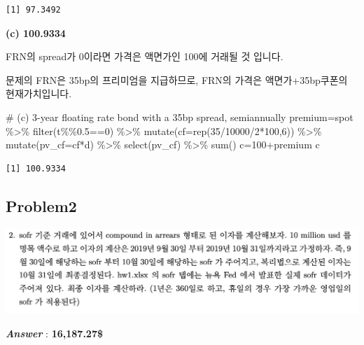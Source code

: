 \documentclass[
  a4paper,
  DIV=11,
  numbers=noendperiod]{scrreprt}
\newenvironment{Shaded}{\begin{snugshade}}{\end{snugshade}}
\newcommand{\AttributeTok}[1]{\textcolor[rgb]{0.40,0.45,0.13}{#1}}
\newcommand{\CommentTok}[1]{\textcolor[rgb]{0.37,0.37,0.37}{#1}}
\newcommand{\DecValTok}[1]{\textcolor[rgb]{0.68,0.00,0.00}{#1}}
\newcommand{\FloatTok}[1]{\textcolor[rgb]{0.68,0.00,0.00}{#1}}
\newcommand{\FunctionTok}[1]{\textcolor[rgb]{0.28,0.35,0.67}{#1}}
\newcommand{\NormalTok}[1]{\textcolor[rgb]{0.00,0.23,0.31}{#1}}
\newcommand{\OtherTok}[1]{\textcolor[rgb]{0.00,0.23,0.31}{#1}}
\newcommand{\SpecialCharTok}[1]{\textcolor[rgb]{0.37,0.37,0.37}{#1}}
\begin{document}
\begin{verbatim}
[1] 97.3492
\end{verbatim}

\textbf{(c) 100.9334}

FRN의 spread가 0이라면 가격은 액면가인 100에 거래될 것 입니다.

문제의 FRN은 35bp의 프리미엄을 지급하므로, FRN의 가격은
액면가+35bp쿠폰의 현재가치입니다.

\begin{Shaded}
\begin{Highlighting}[]
\CommentTok{\# (c) 3{-}year floating rate bond with a 35bp spread, semiannually}
\NormalTok{premium}\OtherTok{=}\NormalTok{spot }\SpecialCharTok{\%\textgreater{}\%}
  \FunctionTok{filter}\NormalTok{(t}\SpecialCharTok{\%\%}\FloatTok{0.5}\SpecialCharTok{==}\DecValTok{0}\NormalTok{) }\SpecialCharTok{\%\textgreater{}\%} 
  \FunctionTok{mutate}\NormalTok{(}\AttributeTok{cf=}\FunctionTok{rep}\NormalTok{(}\DecValTok{35}\SpecialCharTok{/}\DecValTok{10000}\SpecialCharTok{/}\DecValTok{2}\SpecialCharTok{*}\DecValTok{100}\NormalTok{,}\DecValTok{6}\NormalTok{)) }\SpecialCharTok{\%\textgreater{}\%} 
  \FunctionTok{mutate}\NormalTok{(}\AttributeTok{pv\_cf=}\NormalTok{cf}\SpecialCharTok{*}\NormalTok{d) }\SpecialCharTok{\%\textgreater{}\%} 
  \FunctionTok{select}\NormalTok{(pv\_cf) }\SpecialCharTok{\%\textgreater{}\%} 
  \FunctionTok{sum}\NormalTok{()}
\NormalTok{c}\OtherTok{=}\DecValTok{100}\SpecialCharTok{+}\NormalTok{premium}
\NormalTok{c}
\end{Highlighting}
\end{Shaded}

\begin{verbatim}
[1] 100.9334
\end{verbatim}

\subsection*{Problem2}\label{problem2}

\includegraphics{images/이자율hw1_2.png}

\textbf{\emph{Answer}} : \textbf{16,187.27\$}
\end{document}
